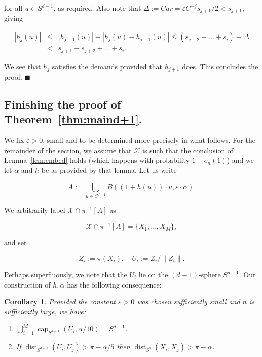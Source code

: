\documentclass[11pt]{article}%
\newenvironment{proofof}[1]{\vspace{1ex}\noindent{\bf Proof of #1.}}{\hspace*{\fill}$\blacksquare$\vspace{1ex}}
\newtheorem{corollary}[corollary]{Corollary}
\newcommand{\Xcal}[0]{\ensuremath{{\mathcal X}}}
\newcommand{\norm}[1]{\ensuremath{\left\|#1\right\|}}
\newcommand{\eps}{\varepsilon}
\DeclareMathOperator{\dist}{dist}
\DeclareMathOperator{\kap}{cap}
\begin{document}
\begin{proofof}{Lemma~\ref{lem:embed}}
\noindent
for all $u \in S^{d-1}$, as
required.
Also note that $\Delta := Car = \eps C^{-j} s_{j+1}/2 < s_{j+1}$, giving

$$ \begin{array}{rcl} 
|h_j(u)| 
& \leq & 
|h_{j+1}(u)| + |h_j(u)-h_{j+1}(u)| \leq 
(s_{j+2} + \dots + s_i) + \Delta \\ 
& < & 
s_{j+1} + s_{j+2} + \dots + s_i. 
\end{array} $$

\noindent
We see that $h_j$ satisfies the demands provided that $h_{j+1}$ does. This concludes the proof.
\end{proofof}



\subsection{Finishing the proof of Theorem~\ref{thm:maind+1}.}


We fix $\eps > 0$, small and to be determined more precisely in what follows.
For the remainder of the section, we assume that $\Xcal$ is such that 
the conclusion of Lemma~\ref{lem:embed} holds (which happens with probability $1-o_n(1)$) and we 
let $\alpha$ and $h$ be as provided by that lemma.
Let us write

$$ A := \bigcup_{u \in S^{d-1}} B( (1+h(u)) \cdot u, \eps \cdot \alpha ). $$

\noindent
We arbitrarily label $\Xcal \cap \pi^{-1}[A]$ as 

$$ \Xcal \cap \pi^{-1}[A] = \{X_1,\dots,X_M\}, $$ 

\noindent 
and set 

$$ Z_i := \pi(X_i), \quad U_i := Z_i / \norm{Z_i}. $$

\noindent
Perhaps superfluously, we note that the $U_i$ lie on the $(d-1)$-sphere $S^{d-1}$.
Our construction of $h,\alpha$ has the following consequence:


\begin{corollary}\label{cor:metriccc}
Provided the constant $\eps>0$ was chosen sufficiently small and $n$ is sufficiently large, we have:
\begin{enumerate} 
\item\label{itm:metriccc1} $\displaystyle \bigcup_{i=1}^M \kap_{S^{d-1}}(U_i,\alpha/10) = S^{d-1}$.
\item\label{itm:metriccc2} If $\dist_{S^{d-1}}(U_i,U_j) > \pi-\alpha/5$ then  $\dist_{S^d}(X_i,X_j) > \pi-\alpha$.
\end{enumerate}
\end{corollary}
\end{document}
